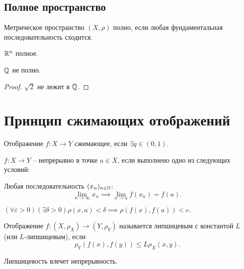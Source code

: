 \subsection{Полное пространство}
\begin{definition}
    \label{def:fullness}
    Метрическое пространство $(X, \rho)$ полно, если любая фундаментальная последовательность сходится.
\end{definition}
\begin{proposition}
    $\mathbb R^n$ полное.
\end{proposition}
\begin{proposition}
    $\mathbb Q$ не полно.
\end{proposition}
\begin{proof}
    $\sqrt 2$ не лежит в $\mathbb Q$.
\end{proof}

\section{Принцип сжимающих отображений}
\begin{definition}
    Отображение $f\colon X \to Y$ сжимающее, если $\exists q \in (0, 1).$
\end{definition}

\begin{definition}[Непрерывность]
    $f\colon X \to Y$ -- непрерывно в точке $a\in X$, если выполнено одно из следующих условий:
    \begin{conditions}
        \item Любая последовательность $(x_n)_{n\in \mathbb N}$:
        \[\lim_{n\to\infty} x_n \implies \lim_{x\to a} f(x_n) = f(a).\]
        \item \((\forall \varepsilon > 0 )(\exists \delta >0) \rho(x, a) < \delta \implies \rho(f(x), f(a)) < e.\)
    \end{conditions}
\end{definition}

\begin{definition}
    Отображение $f\colon (X, \rho_X)\to (Y,\rho_Y)$ называется липшицевым с константой $L$ (или $L$-липшицевым), если \[\rho_Y(f(x), f(y)) \leqslant L\rho_X(x,y).\]
\end{definition}

\begin{theorem}
    Липшицевость влечет непрерывность.
\end{theorem}

